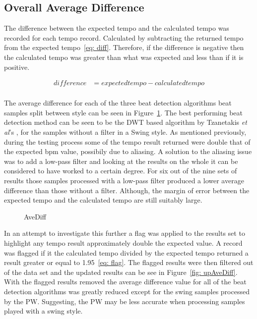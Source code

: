 \documentclass[a4paper, 11pt]{article}
\begin{document}
\subsection{Overall Average Difference}
The difference between the expected tempo and the calculated tempo was recorded for each tempo record. Calculated by subtracting the returned tempo from the expected tempo~\ref{eq: diff}. Therefore, if the difference is negative then the calculated tempo was greater than what was expected and less than if it is positive.

\begin{equation}\label{eq: diff}
\begin{split}
difference& =expected tempo - calculated tempo\\
\end{split}
\end{equation}

The average difference for each of the three beat detection algorithms beat samples split between style can be seen in Figure~\ref{fig: aveDiff}. The best performing beat detection method can be seen to be the DWT based algorithm by Tzanetakis \textit{et al}'s \cite{tzane1}, for the samples without a filter in a Swing style. As mentioned previously, during the testing process some of the tempo result returned were double that of the expected bpm value, possibily due to aliasing. A solution to the aliasing issue was to add a low-pass filter and looking at the results on the whole it can be considered to have worked to a certain degree. For six out of the nine sets of results those samples processed with a low-pass filter produced a lower average difference than those without a filter. Although, the margin of error between the expected tempo and the calculated tempo are still suitably large.\par

\begin{figure}
\caption{AveDiff}
\label{fig: aveDiff}
\end{figure}

In an attempt to investigate this further a flag was applied to the results set to highlight any tempo result approximately double the expected value. A record was flagged if it the calculated tempo divided by the expected tempo returned a result greater or equal to 1.95~\ref{eq: flag}. The flagged results were then filtered out of the data set and the updated results can be see in Figure~\ref{fig: upAveDiff}. With the flagged results removed the average difference value for all of the beat detection algorithms was greatly reduced except for the swing samples processed by the PW. Suggesting, the PW may be less accurate when processing samples played with a swing style.
\end{document}
